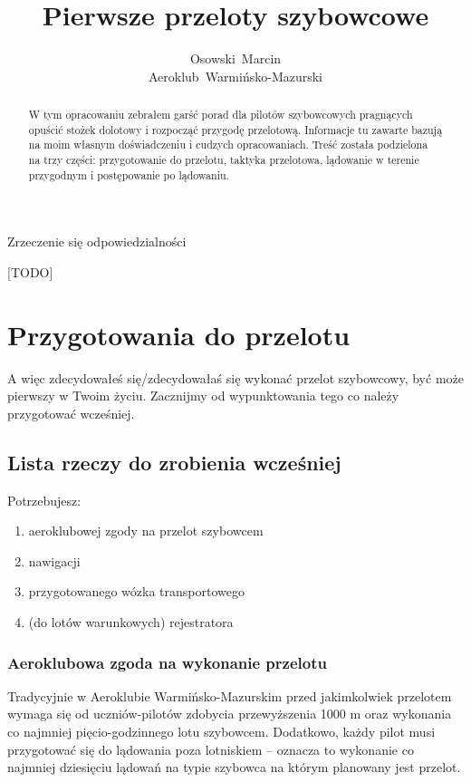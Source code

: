\documentclass{article}
\title{Pierwsze przeloty szybowcowe}
\author{Osowski~Marcin\\Aeroklub~Warmińsko-Mazurski}
\begin{document}
\maketitle
\newpage

\begin{abstract}
W tym opracowaniu zebrałem garść porad dla pilotów szybowcowych
pragnących opuścić stożek dolotowy i rozpocząć
przygodę przelotową. Informacje tu zawarte bazują na moim
własnym doświadczeniu i cudzych opracowaniach. Treść została
podzielona na trzy części: przygotowanie do przelotu, taktyka przelotowa, 
lądowanie w terenie przygodnym i postępowanie po lądowaniu.
\end{abstract}
\newpage

\begin{center}\begin{huge}
Zrzeczenie się odpowiedzialności
\end{huge}\end{center}
[TODO]
%
\newpage

\tableofcontents
\newpage

\section{Przygotowania do przelotu}
A więc zdecydowałeś się/zdecydowałaś się wykonać przelot szybowcowy, być może
pierwszy w Twoim życiu. Zacznijmy od wypunktowania tego co należy
przygotować wcześniej.

\subsection{Lista rzeczy do zrobienia wcześniej}
Potrzebujesz:
\begin{enumerate}
\item aeroklubowej zgody na przelot szybowcem
\item nawigacji
\item przygotowanego wózka transportowego
\item (do lotów warunkowych) rejestratora
\end{enumerate}

\subsubsection{Aeroklubowa zgoda na wykonanie przelotu}
Tradycyjnie w Aeroklubie Warmińsko-Mazurskim przed jakimkolwiek przelotem
wymaga się od uczniów-pilotów zdobycia przewyższenia 1000 m oraz wykonania
co najmniej pięcio-godzinnego lotu szybowcem. Dodatkowo, każdy pilot musi
przygotować się do lądowania poza lotniskiem -- oznacza to wykonanie co
najmniej dziesięciu lądowań na typie szybowca na którym planowany jest
przelot.
\end{document}

